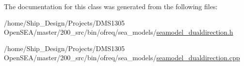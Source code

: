 The documentation for this class was generated from the following files\-:\begin{DoxyCompactItemize}
\item 
/home/\-Ship\-\_\-\-Design/\-Projects/\-D\-M\-S1305 Open\-S\-E\-A/master/200\-\_\-src/bin/ofreq/sea\-\_\-models/\hyperlink{seamodel__dualdirection_8h}{seamodel\-\_\-dualdirection.\-h}\item 
/home/\-Ship\-\_\-\-Design/\-Projects/\-D\-M\-S1305 Open\-S\-E\-A/master/200\-\_\-src/bin/ofreq/sea\-\_\-models/\hyperlink{seamodel__dualdirection_8cpp}{seamodel\-\_\-dualdirection.\-cpp}\end{DoxyCompactItemize}
